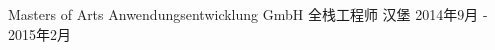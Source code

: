 \cventry
{Masters of Arts Anwendungsentwicklung GmbH} %
{全栈工程师} %
{汉堡} %
{2014年9月 - 2015年2月} %
{ %
}